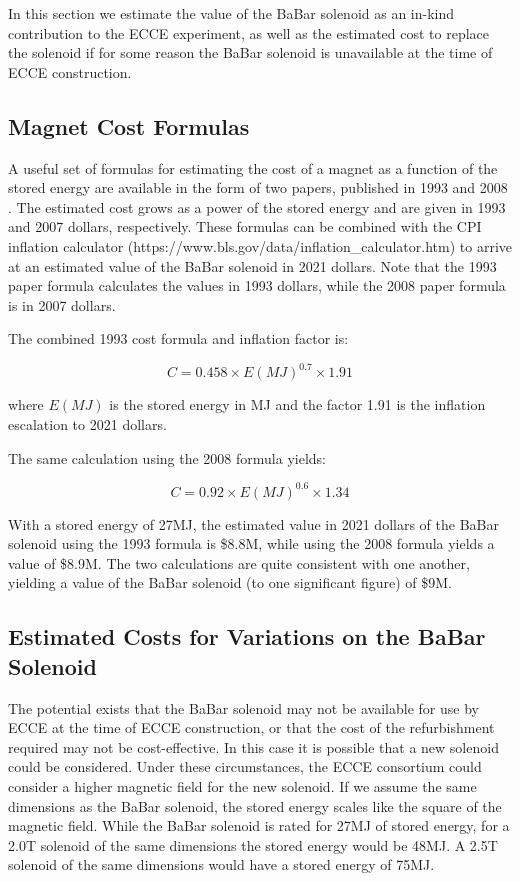 In this section we estimate the value of the BaBar solenoid as an in-kind contribution to the ECCE experiment, as well as the estimated cost to replace the solenoid if for some reason the BaBar solenoid is unavailable at the time of ECCE construction. 

\subsection{Magnet Cost Formulas}

A useful set of formulas for estimating the cost of a magnet as a function of the stored energy are available in the form of two papers, published in 1993 and 2008 \cite{Green1993,Green2008}. The estimated cost grows as a power of the stored energy and are given in 1993 and 2007 dollars, respectively. These formulas can be combined with the CPI inflation calculator (https://www.bls.gov/data/inflation\_calculator.htm) to arrive at an estimated value of the BaBar solenoid in 2021 dollars. Note that the 1993 paper formula calculates the values in 1993 dollars, while the 2008 paper formula is in 2007 dollars. 

The combined 1993 cost formula and inflation factor is: 

\begin{equation}
    C = 0.458 \times E(MJ)^{0.7} \times 1.91
\end{equation}

\noindent where $E(MJ)$ is the stored energy in MJ and the factor 1.91 is the inflation escalation to 2021 dollars. 

The same calculation using the 2008 formula yields: 

\begin{equation}
    C = 0.92 \times E(MJ)^{0.6} \times 1.34
    \label{eq:2008}
\end{equation}

With a stored energy of 27MJ, the estimated value in 2021 dollars of the BaBar solenoid using the 1993 formula is \$8.8M, while using the 2008 formula yields a value of \$8.9M. The two calculations are quite consistent with one another, yielding a value of the BaBar solenoid (to one significant figure) of \$9M. 


\subsection{Estimated Costs for Variations on the BaBar Solenoid}

The potential exists that the BaBar solenoid may not be available for use by ECCE at the time of ECCE construction, or that the cost of the refurbishment required may not be cost-effective. In this case it is possible that a new solenoid could be considered. Under these circumstances, the ECCE consortium could consider a higher magnetic field for the new solenoid. 
If we assume the same dimensions as the BaBar solenoid, the stored energy scales like the square of the magnetic field. While the BaBar solenoid is rated for 27MJ of stored energy, for a 2.0T solenoid of the same dimensions the stored energy would be 48MJ.  A 2.5T solenoid of the same dimensions would have a stored energy of 75MJ. 

